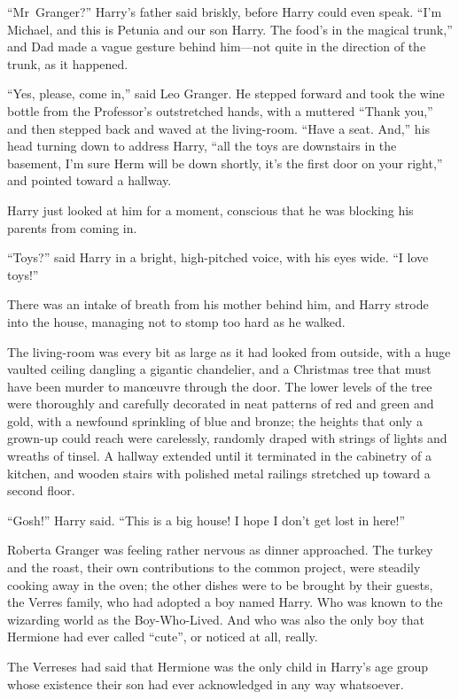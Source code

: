 “Mr~Granger?” Harry’s father said briskly, before Harry could even speak.
“I’m Michael, and this is Petunia and our son Harry. The food’s in the magical trunk,” and Dad made a vague gesture behind him—not quite in the direction of the trunk, as it happened.

“Yes, please, come in,” said Leo Granger. He stepped forward and took the wine bottle from the Professor’s outstretched hands, with a muttered
“Thank you,” and then stepped back and waved at the living-room.
“Have a seat. And,” his head turning down to address Harry, “all the toys are downstairs in the basement, I’m sure Herm will be down shortly, it’s the first door on your right,” and pointed toward a hallway.

Harry just looked at him for a moment, conscious that he was blocking his parents from coming in.

“Toys?” said Harry in a bright, high-pitched voice, with his eyes wide.
“I love toys!”

There was an intake of breath from his mother behind him, and Harry strode into the house, managing not to stomp too hard as he walked.

The living-room was every bit as large as it had looked from outside, with a huge vaulted ceiling dangling a gigantic chandelier, and a Christmas tree that must have been murder to manœuvre through the door. The lower levels of the tree were thoroughly and carefully decorated in neat patterns of red and green and gold, with a newfound sprinkling of blue and bronze; the heights that only a grown-up could reach were carelessly, randomly draped with strings of lights and wreaths of tinsel. A hallway extended until it terminated in the cabinetry of a kitchen, and wooden stairs with polished metal railings stretched up toward a second floor.

“Gosh!” Harry said.
“This is a big house! I hope I don’t get lost in here!”

\later

Roberta Granger was feeling rather nervous as dinner approached. The turkey and the roast, their own contributions to the common project, were steadily cooking away in the oven; the other dishes were to be brought by their guests, the Verres family, who had adopted a boy named Harry. Who was known to the wizarding world as the Boy-Who-Lived. And who was also the only boy that Hermione had ever called “cute”, or noticed at all, really.

The Verreses had said that Hermione was the only child in Harry’s age group whose existence their son had ever acknowledged in any way whatsoever.


